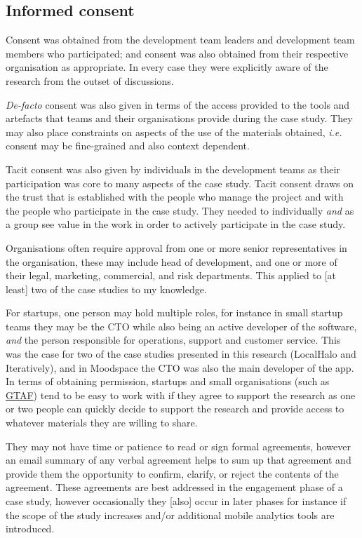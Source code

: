 \subsection{Informed consent}
Consent was obtained from the development team leaders and development team members who participated; and consent was also obtained from their respective organisation as appropriate. In every case they were explicitly aware of the research from the outset of discussions.

\textit{De-facto} consent was also given in terms of the access provided to the tools and artefacts that teams and their organisations provide during the case study. They may also place constraints on aspects of the use of the materials obtained, \textit{i.e.} consent may be fine-grained and also context dependent.

Tacit consent was also given by individuals in the development teams as their participation was core to many aspects of the case study. Tacit consent draws on the trust that is established with the people who manage the project and with the people who participate in the case study. They needed to individually \textit{and} as a group see value in the work in order to actively participate in the case study.


Organisations often require approval from one or more senior representatives in the organisation, these may include head of development, and one or more of their legal, marketing, commercial, and risk departments. This applied to [at least] two of the case studies to my knowledge.

For startups, one person may hold multiple roles, for instance in small startup teams they may be the CTO while also being an active developer of the software, \emph{and} the person responsible for operations, support and customer service. This was the case for two of the case studies presented in this research (LocalHalo and Iteratively), and in Moodspace the CTO was also the main developer of the app. In terms of obtaining permission, startups and small organisations (such as \href{glossary-gtaf}{GTAF}) tend to be easy to work with if they agree to support the research as one or two people can quickly decide to support the research and provide access to whatever materials they are willing to share. 

They may not have time or patience to read or sign formal agreements, however an email summary of any verbal agreement helps to sum up that agreement and provide them the opportunity to confirm, clarify, or reject the contents of the agreement. These agreements are best addressed in the engagement phase of a case study, however occasionally they [also] occur in later phases for instance if the scope of the study increases and/or additional mobile analytics tools are introduced.

